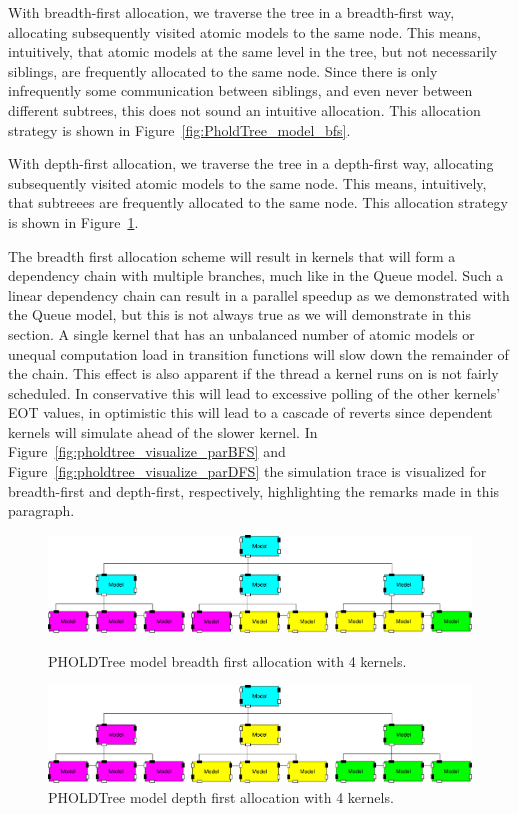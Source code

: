 With breadth-first allocation, we traverse the tree in a breadth-first way, allocating subsequently visited atomic models to the same node.
This means, intuitively, that atomic models at the same level in the tree, but not necessarily siblings, are frequently allocated to the same node.
Since there is only infrequently some communication between siblings, and even never between different subtrees, this does not sound an intuitive allocation.
This allocation strategy is shown in Figure~\ref{fig:PholdTree_model_bfs}.

With depth-first allocation, we traverse the tree in a depth-first way, allocating subsequently visited atomic models to the same node.
This means, intuitively, that subtreees are frequently allocated to the same node.
This allocation strategy is shown in Figure~\ref{fig:PholdTree_model_dfs}.

The breadth first allocation scheme will result in kernels that will form a dependency chain with multiple branches, much like in the Queue model.
Such a linear dependency chain can result in a parallel speedup as we demonstrated with the Queue model, but this is not always true as we will demonstrate in this section.
A single kernel that has an unbalanced number of atomic models or unequal computation load in transition functions will slow down the remainder of the chain.
This effect is also apparent if the thread a kernel runs on is not fairly scheduled.
In conservative this will lead to excessive polling of the other kernels' EOT values, in optimistic this will lead to a cascade of reverts since dependent kernels will simulate ahead of the slower kernel.
In Figure~\ref{fig:pholdtree_visualize_parBFS} and Figure~\ref{fig:pholdtree_visualize_parDFS} the simulation trace is visualized for breadth-first and depth-first, respectively, highlighting the remarks made in this paragraph.

\begin{figure}
   \center
   
   \includegraphics[width=\columnwidth]{fig/pholdtree_alloc_BF.pdf}
   \caption{PHOLDTree model breadth first allocation with 4 kernels.}
   \label{fig:PholdTree_model_bfs}
   \includegraphics[width=\columnwidth]{fig/pholdtree_alloc_DF.pdf}
   \caption{PHOLDTree model depth first allocation with 4 kernels.}
   \label{fig:PholdTree_model_dfs}
\end{figure}

